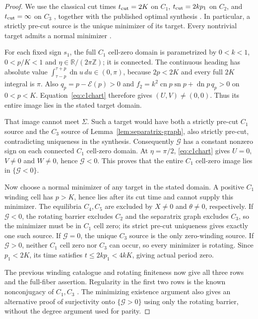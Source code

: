 \documentclass[11pt,a4paper]{article}
\theoremstyle{remark}\newtheorem{remark}[theorem]{Remark}
\newcommand{\sn}{\operatorname{sn}}
\newcommand{\cn}{\operatorname{cn}}
\newcommand{\dn}{\operatorname{dn}}
\begin{document}
\begin{proof}
We use the classical cut times $t_{\rm cut}=2K$ on $C_1$,
$t_{\rm cut}=2kp_1$ on $C_2$, and $t_{\rm cut}=\infty$ on $C_3$
\cite[Theorem 3.3]{SC}\cite[(2.1)--(2.3)]{SS}, together with
the published optimal synthesis \cite[Theorem 3.2]{SS}.
In particular, a strictly pre-cut source is the unique minimizer
of its target. Every nontrivial target admits a normal minimizer
\cite[Sections 1--2]{MS}.

For each fixed sign $s_1$, the full $C_1$ cell-zero domain is
parametrized by $0<k<1$, $0<p/K<1$ and
$\eta\in\mathbb R/(2\pi\mathbb Z)$; it is connected.
The continuous heading has absolute value
$\int_{\tau-p}^{\tau+p}\dn u\,du\in(0,\pi)$, because
$2p<2K$ and every full $2K$ integral is $\pi$.
Also $q_p=p-\mathcal E(p)>0$ and
$f_2=k^2\cn p\sn p+\dn p\,q_p>0$ on $0<p<K$.
Equation~\eqref{eq:c1chart} therefore gives $(U,V)\ne(0,0)$.
Thus its entire image lies in the stated target domain.

That image cannot meet $\Sigma$. Such a target would have both a
strictly pre-cut $C_1$ source and the $C_3$ source of
Lemma~\ref{lem:separatrix-graph}, also strictly pre-cut, contradicting
uniqueness in the synthesis. Consequently $\mathcal G$ has a constant
nonzero sign on each connected $C_1$ cell-zero domain. At
$\eta=\pi/2$, \eqref{eq:c1chart} gives $U=0$, $V\ne0$ and
$W\ne0$, hence $\mathcal G<0$. This proves that the entire
$C_1$ cell-zero image lies in $\{\mathcal G<0\}$.

Now choose a normal minimizer of any target in the stated domain.
A positive $C_1$ winding cell has $p>K$, hence lies after its cut
time and cannot supply this minimizer. The equilibria $C_4,C_5$
are excluded by $X\ne0$ and $\theta\ne0$, respectively.
If $\mathcal G<0$, the rotating barrier excludes $C_2$ and the
separatrix graph excludes $C_3$, so the minimizer must be in $C_1$
cell zero; its strict pre-cut uniqueness gives exactly one such source.
If $\mathcal G=0$, the unique $C_3$ source is the only zero-winding
source. If $\mathcal G>0$, neither $C_1$ cell zero nor $C_3$ can
occur, so every minimizer is rotating. Since $p_1<2K$, its time
satisfies $t\le2kp_1<4kK$, giving actual period zero.

The previous winding catalogue and rotating finiteness now give all
three rows and the full-fiber assertion. Regularity in the first two
rows is the known nonconjugacy of $C_1,C_3$ \cite[Theorems 2.1, 2.4]{SC}.
The minimizing existence argument also gives an alternative proof of
surjectivity onto $\{\mathcal G>0\}$ using only the rotating barrier,
without the degree argument used for parity.
\end{proof}
\end{document}
